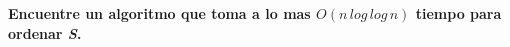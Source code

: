 \textbf{Encuentre un algoritmo que toma a lo mas $O(n \, log \, log \, n)$
tiempo para ordenar \textit{S}.}